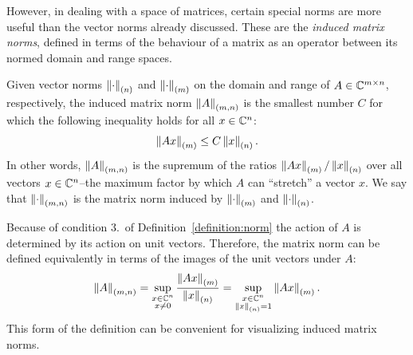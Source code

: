 However, in dealing with a space of matrices, certain special norms are more useful than the vector norms already discussed. These are the {\em induced matrix norms}, defined in terms of the behaviour of a matrix as an operator between its normed domain and range spaces.

Given vector norms $\left\|{\cdot}\right\|_{(n)}$ and $\left\|{\cdot}\right\|_{(m)}$ on the domain and range of $A\in\mathbb{C}^{m\times n}$, respectively, the induced matrix norm $\left\|{A}\right\|_{(m,n)}$ is the smallest number $C$ for which the following inequality holds for all $x\in\mathbb{C}^n$:
\begin{equation}
\left\|{Ax}\right\|_{(m)} \le C\left\|{x}\right\|_{(n)}.
\end{equation}
In other words, $\left\|{A}\right\|_{(m,n)}$ is the supremum of the ratios $\left\|{Ax}\right\|_{(m)}/\left\|{x}\right\|_{(n)}$ over all vectors $x\in\mathbb{C}^n$--the maximum factor by which $A$ can ``stretch'' a vector $x$. We say that $\left\|{\cdot}\right\|_{(m,n)}$ is the matrix norm induced by $\left\|{\cdot}\right\|_{(m)}$ and $\left\|{\cdot}\right\|_{(n)}$.

Because of condition 3.~of Definition~\ref{definition:norm} the action of $A$ is determined by its action on unit vectors. Therefore, the matrix norm can be defined equivalently in terms of the images of the unit vectors under $A$:
\begin{equation}
\left\|{A}\right\|_{(m,n)} = \sup_{\substack{x\in\mathbb{C}^n\\x\ne0}}\dfrac{\left\|{Ax}\right\|_{(m)}}{\left\|{x}\right\|_{(n)}} = \sup_{\substack{x\in\mathbb{C}^n\\ \left\|{x}\right\|_{(n)} = 1}}\left\|{Ax}\right\|_{(m)}.
\end{equation}
This form of the definition can be convenient for visualizing induced matrix norms.

